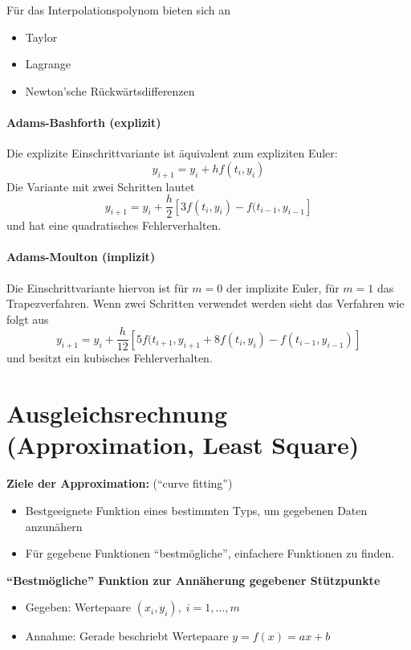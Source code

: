 Für das Interpolationspolynom bieten sich an
\begin{itemize}
\item Taylor
\item Lagrange
\item Newton'sche Rückwärtsdifferenzen
\end{itemize}

\paragraph{Adams-Bashforth (explizit)}
Die explizite Einschrittvariante ist äquivalent zum expliziten Euler:
\begin{equation}
y_{i + 1} = y_i + h f(t_i, y_i)
\end{equation}
Die Variante mit zwei Schritten lautet
\begin{equation}
y_{i + 1} = y_i + \frac{h}{2} \left[ 3 f(t_i, y_i) - f(t_{i - 1}, y_{i - 1} \right]
\end{equation}
und hat eine quadratisches Fehlerverhalten.

\paragraph{Adams-Moulton (implizit)}
Die Einschrittvariante hiervon ist für $m = 0$ der implizite Euler, für $m = 1$ das Trapezverfahren. Wenn zwei Schritten verwendet werden sieht das Verfahren wie folgt aus
\begin{equation}
y_{i + 1} = y_i + \frac{h}{12} \left[ 5 f(t_{i + 1}, y_{i + 1} + 8 f(t_i, y_i) - f(t_{i - 1}, y_{i - 1}) \right]
\end{equation}
und besitzt ein kubisches Fehlerverhalten.

\section{Ausgleichsrechnung (Approximation, Least Square)}
\textbf{Ziele der Approximation:} ("`curve fitting"')
\begin{itemize}
\item Bestgeeignete Funktion eines bestimmten Typs, um gegebenen Daten anzunähern
\item Für gegebene Funktionen "`bestmögliche"', einfachere Funktionen zu finden. 
\end{itemize}

\textbf{"`Bestmögliche"' Funktion zur Annäherung gegebener Stützpunkte}
\begin{itemize}
\item Gegeben: Wertepaare $(x_i,y_i),\;i=1,\ldots ,m$
\item Annahme: Gerade beschriebt Wertepaare $y = f(x) = ax+b$ 
\end{itemize}

